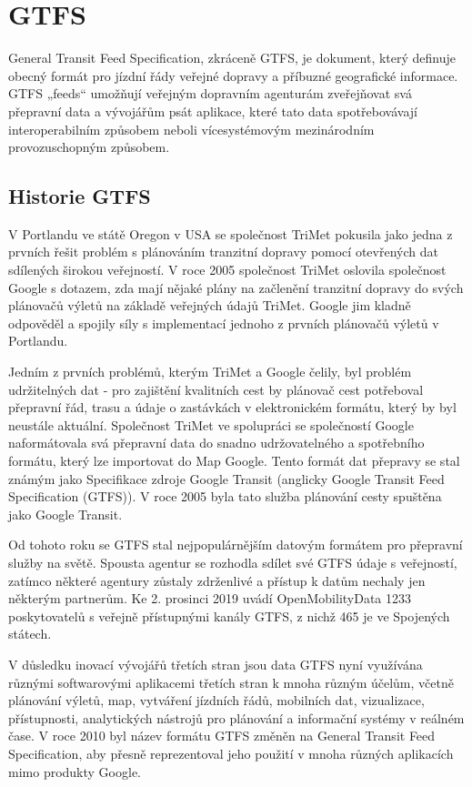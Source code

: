 \chapter{GTFS}
\label{2-teorie-gtfs}

General Transit Feed Specification, zkráceně GTFS, je dokument, který definuje
obecný formát pro jízdní řády veřejné dopravy a příbuzné geografické informace.
GTFS „feeds“ umožňují veřejným dopravním agenturám zveřejňovat svá přepravní
data a vývojářům psát aplikace, které tato data spotřebovávají interoperabilním
způsobem neboli vícesystémovým mezinárodním provozuschopným způsobem. \cite{gtfs-info}

\section{Historie GTFS}
V Portlandu ve státě Oregon v USA se společnost TriMet pokusila jako jedna z prvních 
řešit problém s plánováním tranzitní dopravy pomocí otevřených dat sdílených širokou veřejností.
V roce 2005 společnost TriMet oslovila společnost Google s dotazem, zda mají nějaké plány
na začlenění tranzitní dopravy do svých plánovačů výletů na základě veřejných údajů TriMet.
Google jim kladně odpověděl a spojily síly s implementací jednoho z prvních plánovačů výletů v Portlandu.

Jedním z prvních problémů, kterým TriMet a Google čelily, byl problém udržitelných dat
- pro zajištění kvalitních cest by plánovač cest potřeboval přepravní řád, 
trasu a údaje o zastávkách v elektronickém formátu, který by byl neustále aktuální. 
Společnost TriMet ve spolupráci se společností Google naformátovala svá přepravní 
data do snadno udržovatelného a spotřebního formátu, který lze importovat do Map Google. 
Tento formát dat přepravy se stal známým jako Specifikace zdroje Google Transit (anglicky
Google Transit Feed Specification (GTFS)). 
V roce 2005 byla tato služba plánování cesty spuštěna jako Google Transit.

Od tohoto roku se GTFS stal nejpopulárnějším datovým formátem pro přepravní služby na světě. 
Spousta agentur se rozhodla sdílet své GTFS údaje s veřejností, zatímco některé agentury 
zůstaly zdrženlivé a přístup k datům nechaly jen některým partnerům. Ke 2. prosinci 2019
uvádí OpenMobilityData 1233 poskytovatelů s veřejně přístupnými kanály GTFS,
z nichž 465 je ve Spojených státech. 

V důsledku inovací vývojářů třetích stran jsou data GTFS nyní využívána různými softwarovými aplikacemi
třetích stran k mnoha různým účelům, včetně plánování výletů, map, vytváření jízdních řádů, mobilních dat,
vizualizace, přístupnosti, analytických nástrojů pro plánování a informační systémy v reálném čase.
V roce 2010 byl název formátu GTFS změněn na General Transit Feed Specification,
aby přesně reprezentoval jeho použití v mnoha různých aplikacích mimo produkty Google. \cite{transitwiki} 
 
